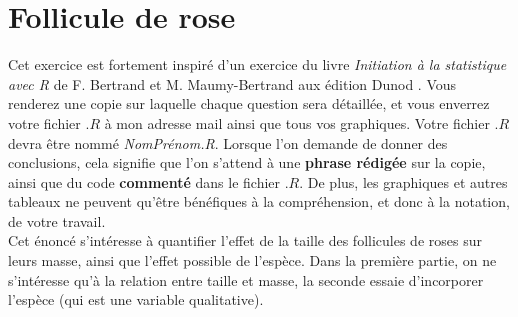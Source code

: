 \section{Follicule de rose}

Cet exercice est fortement inspiré d'un exercice du livre \textit{Initiation à la statistique avec R} de F. Bertrand et M. Maumy-Bertrand aux édition Dunod \cite{Bertrand}. Vous renderez une copie sur laquelle chaque question sera détaillée, et vous enverrez votre fichier $.R$ à mon adresse mail ainsi que tous vos graphiques. Votre fichier $.R$ devra être nommé \textit{NomPrénom.R}. Lorsque l'on demande de donner des conclusions, cela signifie que l'on s'attend à une \textbf{phrase rédigée} sur la copie, ainsi que du code \textbf{commenté} dans le fichier $.R$. De plus, les graphiques et autres tableaux ne peuvent qu'être bénéfiques à la compréhension, et donc à la notation, de votre travail.\\

Cet énoncé s'intéresse à quantifier l'effet de la taille des follicules de roses sur leurs masse, ainsi que l'effet possible de l'espèce. Dans la première partie, on ne s'intéresse qu'à la relation entre taille et masse, la seconde essaie d'incorporer l'espèce (qui est une variable qualitative).\\

